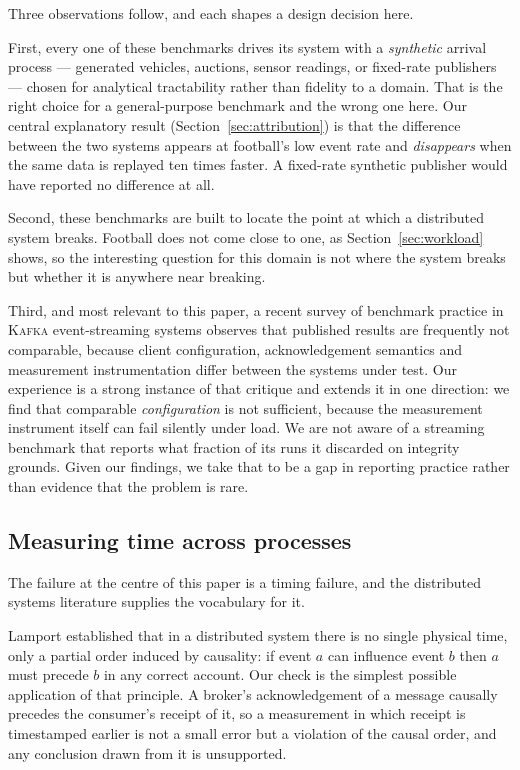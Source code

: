 \documentclass[Afour,sageh,times]{sagej}
\newcommand{\kafka}{\textsc{Kafka}}
\begin{document}
Three observations follow, and each shapes a design decision here.

First, every one of these benchmarks drives its system with a \emph{synthetic} arrival process
--- generated vehicles, auctions, sensor readings, or fixed-rate publishers --- chosen for
analytical tractability rather than fidelity to a domain. That is the right choice for a
general-purpose benchmark and the wrong one here. Our central explanatory result
(Section~\ref{sec:attribution}) is that the difference between the two systems appears at
football's low event rate and \emph{disappears} when the same data is replayed ten times faster.
A fixed-rate synthetic publisher would have reported no difference at all.

Second, these benchmarks are built to locate the point at which a distributed system breaks.
Football does not come close to one, as Section~\ref{sec:workload} shows, so the interesting
question for this domain is not where the system breaks but whether it is anywhere near breaking.

Third, and most relevant to this paper, a recent survey of benchmark practice in \kafka{}
event-streaming systems \cite{mohammad2025kafka} observes that published results are frequently
not comparable, because client configuration, acknowledgement semantics and measurement
instrumentation differ between the systems under test. Our experience is a strong instance of
that critique and extends it in one direction: we find that comparable \emph{configuration} is
not sufficient, because the measurement instrument itself can fail silently under load. We are
not aware of a streaming benchmark that reports what fraction of its runs it discarded on
integrity grounds. Given our findings, we take that to be a gap in reporting practice rather than
evidence that the problem is rare.

\subsection{Measuring time across processes}
\label{sec:lit_clocks}

The failure at the centre of this paper is a timing failure, and the distributed systems
literature supplies the vocabulary for it.

Lamport \cite{lamport1978time} established that in a distributed system there is no single
physical time, only a partial order induced by causality: if event $a$ can influence event $b$
then $a$ must precede $b$ in any correct account. Our check is the simplest possible application
of that principle. A broker's acknowledgement of a message causally precedes the consumer's
receipt of it, so a measurement in which receipt is timestamped earlier is not a small error but
a violation of the causal order, and any conclusion drawn from it is unsupported.
\end{document}
